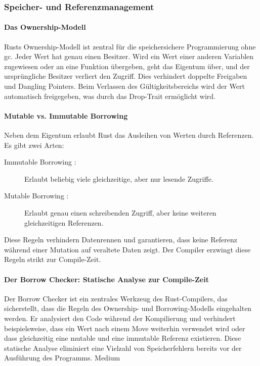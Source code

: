 \subsubsection{Speicher- und Referenzmanagement}

\paragraph{Das Ownership-Modell}
Rusts Ownership-Modell ist zentral für die speichersichere Programmierung ohne \ac{gc}. Jeder Wert hat genau einen Besitzer. Wird ein Wert einer anderen Variablen zugewiesen oder an eine Funktion übergeben, geht das Eigentum über, und der ursprüngliche Besitzer verliert den Zugriff. Dies verhindert doppelte Freigaben und Dangling Pointers. Beim Verlassen des Gültigkeitsbereichs wird der Wert automatisch freigegeben, was durch das Drop-Trait ermöglicht wird. \cite{wiki2024rust}

\paragraph{Mutable vs. Immutable Borrowing}

Neben dem Eigentum erlaubt Rust das Ausleihen von Werten durch Referenzen. Es gibt zwei Arten:
\begin{description}
    \item[Immutable Borrowing :] Erlaubt beliebig viele gleichzeitige, aber nur lesende Zugriffe.
    \item[Mutable Borrowing :] Erlaubt genau einen schreibenden Zugriff, aber keine weiteren gleichzeitigen Referenzen.
\end{description}

Diese Regeln verhindern Datenrennen und garantieren, dass keine Referenz während einer Mutation auf veraltete Daten zeigt. Der Compiler erzwingt diese Regeln strikt zur Compile-Zeit.

\paragraph{Der Borrow Checker: Statische Analyse zur Compile-Zeit}
Der Borrow Checker ist ein zentrales Werkzeug des Rust-Compilers, das sicherstellt, dass die Regeln des Ownership- und Borrowing-Modells eingehalten werden. Er analysiert den Code während der Kompilierung und verhindert beispielsweise, dass ein Wert nach einem Move weiterhin verwendet wird oder dass gleichzeitig eine mutable und eine immutable Referenz existieren. Diese statische Analyse eliminiert eine Vielzahl von Speicherfehlern bereits vor der Ausführung des Programms.
Medium

